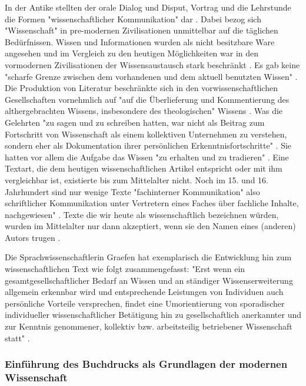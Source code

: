 In der Antike stellten der orale Dialog und Disput, Vortrag und die Lehrstunde die Formen "wissenschaftlicher Kommunikation" dar \cite{hollricher_wandel_2009}. Dabei bezog sich "Wissenschaft" in pre-modernen Zivilisationen unmittelbar auf die täglichen Bedürfnissen. Wissen und Informationen wurden als nicht besitzbare Ware angesehen \cite{cite:18} \cite{steiner_1998_autorenhonorar} und im Vergleich zu den heutigen Möglichkeiten war in den vormodernen Zivilisationen der Wissensaustausch stark beschränkt \cite{cite:17c}. Es gab keine "scharfe Grenze zwischen dem vorhandenen und dem aktuell benutzten Wissen" \cite{Luhmann1998}. Die Produktion von Literatur beschränkte sich in den vorwissenschaftlichen Gesellschaften vornehmlich auf "auf die Überlieferung und Kommentierung des althergebrachten Wissens, insbesondere des theologischen" Wissens \cite{steiner_1998_autorenhonorar}. Was die Gelehrten "zu sagen und zu schreiben hatten, war nicht als Beitrag zum Fortschritt von Wissenschaft als einem kollektiven Unternehmen zu verstehen, sondern eher als Dokumentation ihrer persönlichen Erkenntnisfortschritte" \cite{graefen2007_wissenschaftliche_artikel}. Sie hatten vor allem die Aufgabe das Wissen "zu erhalten und zu tradieren" \cite{Luhmann1998}. Eine Textart, die dem heutigen wissenschaftlichen Artikel entspricht oder mit ihm vergleichbar ist, existierte bis zum Mittelalter nicht. Noch im 15. und 16. Jahrhundert sind nur wenige Texte "fachinterner Kommunikation" also schriftlicher Kommunikation unter Vertretern eines Faches über fachliche Inhalte, nachgewiesen" \cite{graefen2007_wissenschaftliche_artikel}. Texte die wir heute als wissenschaftlich bezeichnen würden, wurden im Mittelalter nur dann akzeptiert, wenn sie den Namen eines (anderen) Autors trugen \cite{foucault_2000_autor}.

Die Sprachwissenschaftlerin Graefen hat exemplarisch die Entwicklung hin zum wissenschaftlichen Text wie folgt zusammengefasst: "Erst wenn ein gesamtgesellschaftlicher Bedarf an Wissen und an ständiger Wissenserweiterung allgemein erkennbar wird und entsprechende Leistungen von Individuen auch persönliche Vorteile versprechen, findet eine Umorientierung von sporadischer individueller wissenschaftlicher Betätigung hin zu gesellschaftlich anerkannter und zur Kenntnis genommener, kollektiv bzw. arbeitsteilig betriebener Wissenschaft statt" \cite{graefen2007_wissenschaftliche_artikel}.

\subsubsection{Einführung des Buchdrucks als Grundlagen der modernen Wissenschaft}

